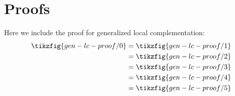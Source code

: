 \chapter[Proofs]{Proofs} \label{ch:a1}

Here we include the proof for generalized local complementation:
{\allowdisplaybreaks
\begin{align*}
  \tikzfig{gen-lc-proof/0} &= \tikzfig{gen-lc-proof/1} \\
  &= \tikzfig{gen-lc-proof/2} \\
  &= \tikzfig{gen-lc-proof/3} \\
  &= \tikzfig{gen-lc-proof/4} \\
  &= \tikzfig{gen-lc-proof/5}
\end{align*}}
